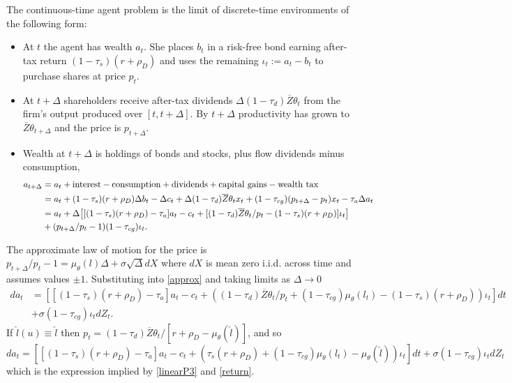 \documentclass[11pt]{article}
\theoremstyle{plain}
\begin{document}
The continuous-time agent problem is the limit of discrete-time environments of the following form:
\begin{itemize}
\item At $t$ the agent has wealth $a_t$. She places $b_t$ in a risk-free bond earning after-tax return $(1-\tau_s)(r+\rho_D)$ and uses the remaining $\iota_t := a_t - b_t$ to purchase shares at price $p_t$. 
\item At $t+\Delta$ shareholders receive after-tax dividends $\Delta (1-\tau_d)\overline{Z}\theta_t$ from the firm's output produced over $[t,t+\Delta]$. By $t+\Delta$ productivity has grown to $\overline{Z}\theta_{t+\Delta}$ and the price is $p_{t+\Delta}$.
\item Wealth at $t+\Delta$ is holdings of bonds and stocks, plus flow dividends minus consumption,
\begin{equation}
\begin{aligned}
a_{t+\Delta} & = a_t + \textnormal{interest} - \textnormal{consumption} + \textnormal{dividends} + \textnormal{capital gains} - \textnormal{wealth tax}
\\ & = a_t + (1-\tau_s)(r + \rho_D)\Delta b_t - \Delta c_t + \Delta (1-\tau_d)\overline{Z} \theta_t x_t + (1-\tau_{cg}) (p_{t+\Delta} - p_{t})x_t - \tau_a\Delta a_t
\\ & = a_t + \Delta {\left[[(1-\tau_s)(r + \rho_D) - \tau_a] a_t -  c_t +  [(1-\tau_d)\overline{Z} \theta_t/p_t - (1-\tau_s)(r + \rho_D)]\iota_t\right]} \\ & + (p_{t+\Delta}/p_t-1)(1-\tau_{cg})\iota_t.
\end{aligned}
\label{approx}
\end{equation} %
\end{itemize}
The approximate law of motion for the price is $p_{t+\Delta}/p_t - 1 = \mu_{\theta}(l)\Delta + \sigma \sqrt{\Delta} dX$ where $dX$ is mean zero i.i.d. across time and assumes values $\pm 1$. Substituting into \eqref{approx} and taking limits as $\Delta \rightarrow 0$
\begin{align*}
da_t & = {\left[[(1-\tau_s)(r + \rho_D) - \tau_a]a_t - c_t + {\left((1-\tau_d)\overline{Z}\theta_t/p_t + (1-\tau_{cg})\mu_{\theta}(l_t) - (1-\tau_s)(r + \rho_D)\right)} \iota_t \right]}dt
\\ & + \sigma (1-\tau_{cg})\iota_t dZ_t.
\end{align*}
If $\hat{l}(u) \equiv \hat{l}$ then $p_t = (1-\tau_d)\overline{Z}\theta_t/[r + \rho_D - \mu_{\theta}(\hat{l})]$, and so 
$$
da_t = {\left[[(1-\tau_s)(r + \rho_D) - \tau_a]a_t - c_t + {\left(\tau_s (r + \rho_D) + (1- \tau_{cg})\mu_{\theta}(l_t) - \mu_{\theta}(\hat{l})\right)}\iota_t\right]}dt + \sigma (1-\tau_{cg})\iota_t dZ_t
$$
which is the expression implied by \eqref{linearP3} and \eqref{return}. 
\end{document}
